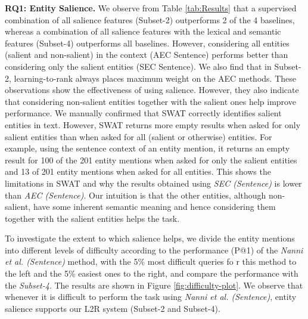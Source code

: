 \textbf{RQ1: Entity Salience.}
We observe from Table \ref{tab:Results} that a supervised combination of all salience features (Subset-2) outperforms 2 of the 4 baselines, whereas a combination of all salience features with the lexical and semantic features (Subset-4) outperforms all baselines. However, considering all entities (salient and non-salient) in the context (AEC Sentence) performs better than considering only the salient entities (SEC Sentence). We also find that in Subset-2, learning-to-rank always places maximum weight on the AEC methods.
These observations show the effectiveness of using salience. However, they also indicate that considering non-salient entities together with the salient ones help improve performance. We manually confirmed that SWAT correctly identifies salient entities in text. However, SWAT returns more empty results when asked for only salient entities than when asked for all (salient or otherwise) entities. For example, using the sentence context of an entity mention, it returns an empty result for 100 of the 201 entity mentions when asked for only the salient entities and 13 of 201 entity mentions when asked for all  entities. This shows the limitations in SWAT and why the results obtained using \textit{SEC (Sentence)} is lower than \textit{AEC (Sentence)}.  Our intuition is that the other entities, although non-salient, have some inherent semantic meaning and hence considering them together with the salient entities helps the task. %

To investigate the extent to which salience helps, we divide the entity mentions  into different levels of difficulty according to the performance (P@1) of the \textit{Nanni et al. (Sentence)} method, with the 5\% most difficult queries fo
r this method to the left and the 5\% easiest ones to the right, and compare the performance with the \textit{Subset-4}. The results are shown in Figure \ref{fig:difficulty-plot}. We observe that whenever it is difficult to perform the task using \textit{Nanni et al. (Sentence)}, entity salience supports our L2R system (Subset-2 and Subset-4).

